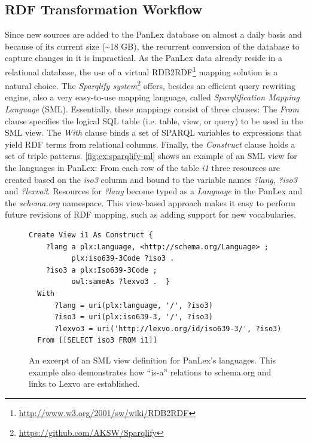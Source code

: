 \documentclass[sw]{iosart2c}
\begin{document}
\subsection{RDF Transformation Workflow}
\label{sec:conversion}
Since new sources are added to the PanLex database on almost a daily basis and because of its current size (\textasciitilde18 GB), the recurrent conversion of the database to capture changes in it is impractical.
As the PanLex data already reside in a relational database, the use of a virtual RDB2RDF\footnote{\url{http://www.w3.org/2001/sw/wiki/RDB2RDF}} mapping solution is a natural choice.
The \emph{Sparqlify system}\footnote{\url{https://github.com/AKSW/Sparqlify}} offers, besides an efficient query rewriting engine, also a very easy-to-use mapping language, called \emph{Sparqlification Mapping Language} (SML).
Essentially, these mappings consist of three clauses:
The \emph{From} clause specifies the logical SQL table (i.e. table, view, or
query) to be used in the SML view.
The \emph{With} clause binds a set of SPARQL variables to expressions that
yield RDF terms from relational columns.
Finally, the \emph{Construct} clause holds a set of triple patterns.
\autoref{fig:ex:sparqlify-ml} shows an example of an SML view for the
languages in PanLex: From each row of the table \emph{i1} three resources are
created based on the \emph{iso3} column and 
bound to the variable names \emph{?lang}, \emph{?iso3} and \emph{?lexvo3}.
Resources for \emph{?lang} become typed as a \emph{Language} in the PanLex and the \emph{schema.org} namespace.
This view-based approach makes it easy to perform future revisions of RDF mapping, such as
adding support for new vocabularies.

\begin{figure}
\centering
\begin{lstlisting}
Create View i1 As Construct {
    ?lang a plx:Language, <http://schema.org/Language> ;
          plx:iso639-3Code ?iso3 .
    ?iso3 a plx:Iso639-3Code ;
          owl:sameAs ?lexvo3 .  }
  With
      ?lang = uri(plx:language, '/', ?iso3)
      ?iso3 = uri(plx:iso639-3, '/', ?iso3)
      ?lexvo3 = uri('http://lexvo.org/id/iso639-3/', ?iso3)
  From [[SELECT iso3 FROM i1]]
\end{lstlisting}
\caption{An excerpt of an SML view definition for PanLex's languages. This
example also demonstrates how ``is-a'' relations to schema.org and links to Lexvo are established.}
\label{fig:ex:sparqlify-ml}
\end{figure}
\end{document}
